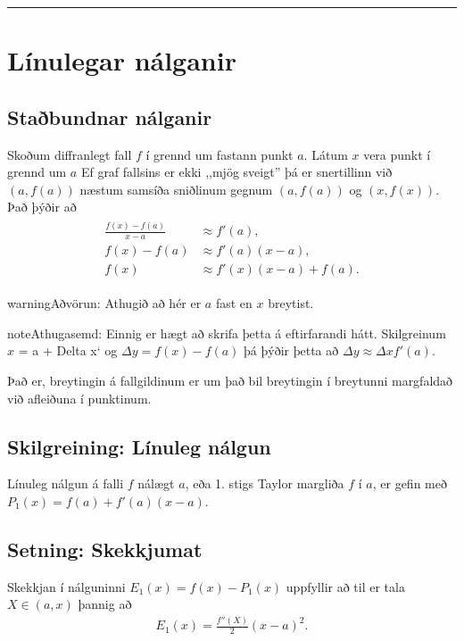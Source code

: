 \documentclass[b5paper,11pt,icelandic]{sphinxmanual}
\begin{document}
\bigskip\hrule{}\bigskip



\section{Línulegar nálganir}
\label{kafli03:linulegar-nalganir}

\subsection{Staðbundnar nálganir}
\label{kafli03:stabundnar-nalganir}
Skoðum diffranlegt fall \(f\) í grennd um fastann punkt
\(a\). Látum \(x\) vera punkt í grennd um \(a\)
Ef graf fallsins er ekki ,,mjög
sveigt” þá er snertillinn við \((a,f(a))\) næstum samsíða
sniðlinum gegnum \((a,f(a))\) og \((x,f(x))\).
Það þýðir að
\begin{equation*}
\begin{split}\begin{aligned}
     \frac{f(x)-f(a)}{x-a} &\approx f'(a),\\
     f(x)-f(a) &\approx  f'(a)(x-a),\\
     f(x) &\approx f'(x)(x-a) + f(a).
\end{aligned}\end{split}
\end{equation*}
\begin{notice}{warning}{Aðvörun:}
Athugið að hér er \(a\) fast en \(x\) breytist.
\end{notice}

\begin{notice}{note}{Athugasemd:}
Einnig er hægt að skrifa þetta á eftirfarandi hátt.
Skilgreinum \(x\) = a + Delta x{}` og
\(\Delta y = f(x) - f(a)\) þá þýðir þetta að
\(\Delta y \approx \Delta x f'(a)\).

Það er, breytingin á fallgildinum er um það bil breytingin í
breytunni margfaldað við afleiðuna í punktinum.
\end{notice}


\subsection{Skilgreining: Línuleg nálgun}
\label{kafli03:skilgreining-linuleg-nalgun}
Línuleg nálgun á falli \(f\) nálægt \(a\), eða 1. stigs Taylor
margliða \(f\) í \(a\), er gefin með
\(P_1(x)=f(a)+f'(a)(x-a)\).


\subsection{Setning: Skekkjumat}
\label{kafli03:setning-skekkjumat}
Skekkjan í nálguninni \(E_1(x)=f(x)-P_1(x)\) uppfyllir að til er
tala \(X \in (a,x)\) þannig að
\begin{equation*}
\begin{split}E_1(x)=\frac{f''(X)}{2}(x-a)^2.\end{split}
\end{equation*}
\end{document}
